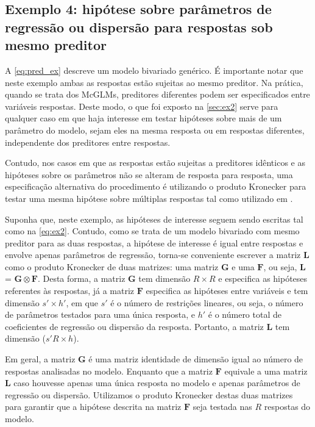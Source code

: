 \documentclass[AMA,STIX1COL]{WileyNJD-v2}
\begin{document}
\subsection{Exemplo 4: hipótese sobre parâmetros de regressão ou dispersão para respostas sob mesmo preditor}\label{sec:sec_ex4}

A \autoref{eq:pred_ex} descreve um modelo bivariado genérico. É importante notar que neste exemplo ambas as respostas estão sujeitas ao mesmo preditor. Na prática, quando se trata dos McGLMs, preditores diferentes podem ser especificados entre variáveis respostas. Deste modo, o que foi exposto na \autoref{sec:ex2} serve para qualquer caso em que haja interesse em testar hipóteses sobre mais de um parâmetro do modelo, sejam eles na mesma resposta ou em respostas diferentes, independente dos preditores entre respostas.

Contudo, nos casos em que as respostas estão sujeitas a preditores idênticos e as hipóteses sobre os parâmetros não se alteram de resposta para resposta, uma especificação alternativa do procedimento é utilizando o produto Kronecker para testar uma mesma hipótese sobre múltiplas respostas tal como utilizado em \cite{plastica}.

Suponha que, neste exemplo, as hipóteses de interesse seguem sendo escritas tal como na \autoref{eq:ex2}. Contudo, como se trata de um modelo bivariado com mesmo preditor para as duas respostas, a hipótese de interesse é igual entre respostas e envolve apenas parâmetros de regressão, torna-se conveniente escrever a matriz $\boldsymbol{L}$ como o produto Kronecker de duas matrizes: uma matriz $\boldsymbol{G}$ e uma $\boldsymbol{F}$, ou seja, $\boldsymbol{L}$ = $\boldsymbol{G} \otimes \boldsymbol{F}$. Desta forma, a matriz $\boldsymbol{G}$ tem dimensão $R \times R$ e especifica as hipóteses referentes às respostas, já a matriz $\boldsymbol{F}$ especifica as hipóteses entre variáveis e tem dimensão ${s}' \times {h}'$, em que ${s}'$ é o número de restrições lineares, ou seja, o número de parâmetros testados para uma única resposta, e ${h}'$ é o número total de coeficientes de regressão ou dispersão da resposta. Portanto, a matriz $\boldsymbol{L}$ tem dimensão (${s}'R \times h$).

Em geral, a matriz $\boldsymbol{G}$ é uma matriz identidade de dimensão igual ao número de respostas analisadas no modelo. Enquanto que a matriz $\boldsymbol{F}$ equivale a uma matriz $\boldsymbol{L}$ caso houvesse apenas uma única resposta no modelo e apenas parâmetros de regressão ou dispersão. Utilizamos o produto Kronecker destas duas matrizes para garantir que a hipótese descrita na matriz $\boldsymbol{F}$ seja testada nas $R$ respostas do modelo.
\end{document}
